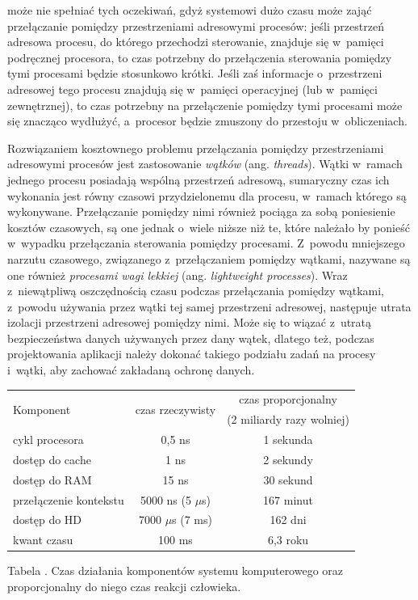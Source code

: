 \documentclass[12pt]{mwart}
\newcounter{tabmain}
\newcommand{\mytabcaption}[1]{ \begin{center}Tabela \arabic{tabmain}. #1.\end{center} \addtocounter{tabmain}{1} }
\begin{document}
	może nie spełniać tych oczekiwań, gdyż systemowi dużo czasu może zająć przełączanie pomiędzy przestrzeniami adresowymi procesów:
	jeśli przestrzeń adresowa procesu, do którego przechodzi sterowanie, znajduje się w~pamięci podręcznej procesora, to czas potrzebny do 
	przełączenia sterowania pomiędzy tymi procesami będzie stosunkowo krótki. Jeśli zaś informacje o~przestrzeni adresowej tego procesu znajdują się
	w~pamięci operacyjnej (lub w~pamięci zewnętrznej), to czas potrzebny na przełączenie pomiędzy tymi procesami może się znacząco wydłużyć,
	a~procesor będzie zmuszony do przestoju w~obliczeniach.
\par
%
\indent
	Rozwiązaniem kosztownego problemu przełączania pomiędzy przestrzeniami adresowymi procesów jest zastosowanie \emph{wątków} (ang. \emph{threads}).
	Wątki w~ramach jednego procesu posiadają wspólną przestrzeń adresową, sumaryczny czas ich wykonania jest równy czasowi przydzielonemu dla 
	procesu, w~ramach którego są wykonywane. Przełączanie pomiędzy nimi również pociąga za sobą poniesienie kosztów czasowych, są one jednak
	o~wiele niższe niż te, które należało by ponieść w~wypadku przełączania sterowania pomiędzy procesami. Z~powodu mniejszego narzutu czasowego,
	związanego z~przełączaniem pomiędzy wątkami, nazywane są one również \emph{procesami wagi lekkiej} (ang. \emph{lightweight processes}).
	Wraz z~niewątpliwą oszczędnością czasu podczas przełączania pomiędzy wątkami, z~powodu używania przez wątki tej samej przestrzeni adresowej,
	następuje utrata izolacji przestrzeni adresowej pomiędzy nimi. Może się to wiązać z~utratą bezpieczeństwa danych używanych przez dany wątek,
	dlatego też, podczas projektowania aplikacji należy dokonać takiego podziału zadań na procesy i~wątki, aby zachować zakładaną ochronę danych.
\par
%
\indent
	\begin{center}
	\centering
	\begin{tabular}{|l|c|c|} \hline
		\multirow{2}{*}{Komponent} & \multirow{2}{*}{czas rzeczywisty}	& czas proporcjonalny \\ 
					  &                   & (2 miliardy razy wolniej) \\ \hline
		cykl procesora	& 0,5 ns & 1 sekunda \\\hline
		dostęp do cache & 1 ns & 2 sekundy \\\hline
		dostęp do RAM	  & 15 ns & 30 sekund \\\hline
		przełączenie kontekstu & 5000 ns (5 $\mu$s) & 167 minut \\\hline
		dostęp do HD		& 7000 $\mu$s (7 ms) & 162 dni \\\hline
		kwant czasu 		& 100 ms	& 6,3 roku \\\hline
	\end{tabular}
		\mytabcaption{Czas działania komponentów systemu komputerowego oraz proporcjonalny do niego czas reakcji człowieka}
	\label{tab:timecomp}
	\end{center}
\end{document}

